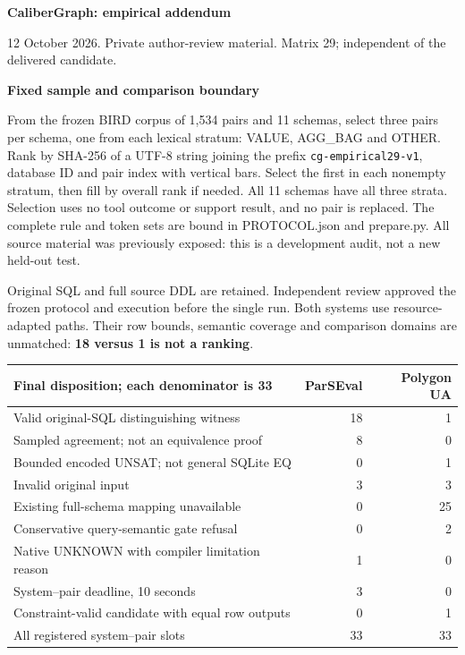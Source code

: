 \documentclass[10pt]{article}
\newcommand{\head}[1]{\medskip\textbf{#1}\par}
\begin{document}
{\Large\bfseries CaliberGraph: empirical addendum}\par
12 October 2026. Private author-review material. Matrix 29; independent of the delivered candidate.

\head{Fixed sample and comparison boundary}
From the frozen BIRD corpus of 1,534 pairs and 11 schemas, select three pairs per schema, one from each lexical stratum: VALUE, AGG\_BAG and OTHER. Rank by SHA-256 of a UTF-8 string joining the prefix \texttt{cg-empirical29-v1}, database ID and pair index with vertical bars. Select the first in each nonempty stratum, then fill by overall rank if needed. All 11 schemas have all three strata. Selection uses no tool outcome or support result, and no pair is replaced. The complete rule and token sets are bound in PROTOCOL.json and prepare.py. All source material was previously exposed: this is a development audit, not a new held-out test.

Original SQL and full source DDL are retained. Independent review approved the frozen protocol and execution before the single run. Both systems use resource-adapted paths. Their row bounds, semantic coverage and comparison domains are unmatched: \textbf{18 versus 1 is not a ranking}.

\begin{center}
\begin{tabularx}{\textwidth}{Xrr}
\toprule
Final disposition; each denominator is 33 & ParSEval & Polygon UA\\
\midrule
Valid original-SQL distinguishing witness & 18 & 1\\
Sampled agreement; not an equivalence proof & 8 & 0\\
Bounded encoded UNSAT; not general SQLite EQ & 0 & 1\\
Invalid original input & 3 & 3\\
Existing full-schema mapping unavailable & 0 & 25\\
Conservative query-semantic gate refusal & 0 & 2\\
Native UNKNOWN with compiler limitation reason & 1 & 0\\
System--pair deadline, 10 seconds & 3 & 0\\
Constraint-valid candidate with equal row outputs & 0 & 1\\
\midrule
All registered system--pair slots & 33 & 33\\
\bottomrule
\end{tabularx}
\end{center}
\end{document}
